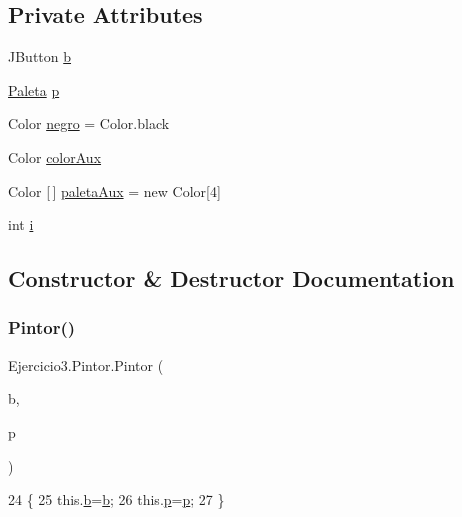 \subsection*{Private Attributes}
\begin{DoxyCompactItemize}
\item 
J\+Button \mbox{\hyperlink{class_ejercicio3_1_1_pintor_a8d94252c712662974ff0d5c2e861570f}{b}}
\item 
\mbox{\hyperlink{class_ejercicio3_1_1_paleta}{Paleta}} \mbox{\hyperlink{class_ejercicio3_1_1_pintor_a3757fe9547d90e3160d3896865c5ccdc}{p}}
\item 
Color \mbox{\hyperlink{class_ejercicio3_1_1_pintor_afad4ac3330456c006258d8a5c3fe8220}{negro}} = Color.\+black
\item 
Color \mbox{\hyperlink{class_ejercicio3_1_1_pintor_a506a8bc9a541e6892869532dea88e748}{color\+Aux}}
\item 
Color \mbox{[}$\,$\mbox{]} \mbox{\hyperlink{class_ejercicio3_1_1_pintor_afe3191b9a051abec819e970119c65acc}{paleta\+Aux}} = new Color\mbox{[}4\mbox{]}
\item 
int \mbox{\hyperlink{class_ejercicio3_1_1_pintor_ad4b925edd7b90b3c76c4f7ae0e0fd67d}{i}}
\end{DoxyCompactItemize}


\subsection{Constructor \& Destructor Documentation}
\mbox{\label{class_ejercicio3_1_1_pintor_ad99dbf461a4b20ed3deddfff5513bce0}} 
\subsubsection{\texorpdfstring{Pintor()}{Pintor()}}
{\footnotesize\ttfamily Ejercicio3.\+Pintor.\+Pintor (\begin{DoxyParamCaption}\item[{J\+Button}]{b,  }\item[{\mbox{\hyperlink{class_ejercicio3_1_1_paleta}{Paleta}}}]{p }\end{DoxyParamCaption})\hspace{0.3cm}{\ttfamily [inline]}}


\begin{DoxyCode}
24     \{
25         this.\mbox{\hyperlink{class_ejercicio3_1_1_pintor_a8d94252c712662974ff0d5c2e861570f}{b}}=\mbox{\hyperlink{class_ejercicio3_1_1_pintor_a8d94252c712662974ff0d5c2e861570f}{b}};
26         this.\mbox{\hyperlink{class_ejercicio3_1_1_pintor_a3757fe9547d90e3160d3896865c5ccdc}{p}}=\mbox{\hyperlink{class_ejercicio3_1_1_pintor_a3757fe9547d90e3160d3896865c5ccdc}{p}};
27     \}
\end{DoxyCode}


